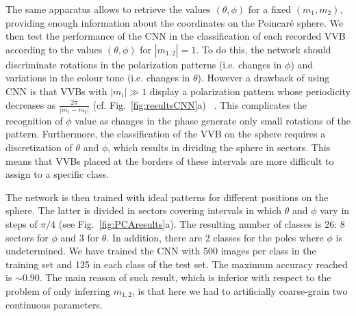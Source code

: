 The same apparatus allows to retrieve the values $(\theta,\phi)$ for a fixed $(m_1, m_2)$,
providing enough information about the coordinates on the Poincar\'e sphere. We then test the performance of the CNN in the classification of each recorded \ac{VVB} according to the values $(\theta,\phi)$ for $|m_{1,2}|=1$. To do this, the network should discriminate rotations in the polarization patterns (i.e. changes in $\phi$) and variations in the colour tone (i.e. changes in $\theta$). However a drawback of using CNN is that \ac{VVB}s with $|m_i|\gg1$ display a polarization pattern whose periodicity decreases as $\frac{2\pi}{|m_1-m_2|}$ (cf. Fig.~\ref{fig:resultsCNN}a)~ \cite{fickler2012quantum,dambrosio2013photonic}. This complicates the recognition of $\phi$ value as changes in the phase generate only small rotations of the pattern. Furthermore, the classification of the VVB on the sphere requires a discretization of  $\theta$ and $\phi$, which results in dividing the sphere in sectors. This means that VVBs placed at the borders of these intervals are more difficult to assign to a specific class.

The network is then trained with ideal patterns for different positions on the sphere. The latter is divided in sectors covering intervals in which $\theta$ and $\phi$ vary in steps of $\pi/4$ (see Fig.~\ref{fig:PCAresults}a). The resulting number of classes is $26$: 8 sectors for $\phi$ and 3 for $\theta$. In addition, there are 
2 classes for the poles where $\phi$ is undetermined. We have trained the CNN with 500 images per class in the training set and 125 in each class of the test set. The maximum accuracy reached is $\sim 0.90$. The main reason of such result, which is inferior with respect to the problem of only inferring $m_{1,2}$, is that here we had to artificially coarse-grain two continuous parameters. 



